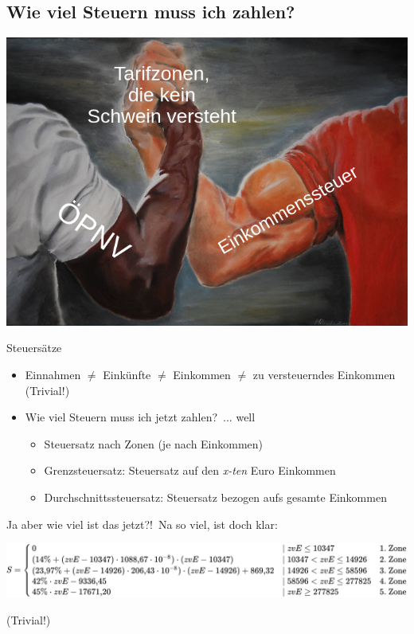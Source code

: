 \documentclass{beamer}
\begin{document}
		\subsection{Wie viel Steuern muss ich zahlen?}
		
			\begin{frame}
				\begin{center}
					\includegraphics[width=0.75\linewidth]{images/tarifzonen}
				\end{center}
			\end{frame}
			
			\begin{frame}{Steuersätze}
				\begin{itemize}
					\item Einnahmen $\neq$ Einkünfte $\neq$ Einkommen $\neq$ zu versteuerndes Einkommen {\tiny (Trivial!)}
					\item Wie viel Steuern muss ich jetzt zahlen?\pause\ ... well\pause
					\begin{itemize}
						\item Steuersatz nach Zonen (je nach Einkommen)
						\item Grenzsteuersatz: Steuersatz auf den \textit{x-ten} Euro Einkommen
						\item Durchschnittssteuersatz: Steuersatz bezogen aufs gesamte Einkommen
					\end{itemize}
				\end{itemize}
				Ja aber wie viel ist das jetzt?!\pause\ Na so viel, ist doch klar:\pause
				\begin{center}
					\includegraphics[width=\textwidth]{images/tarifzonen-formel}
				\end{center}
				\vspace*{-0.25cm}\pause
				{\tiny (Trivial!)}
				\vspace{0.55cm}
			\end{frame}
		
\end{document}
